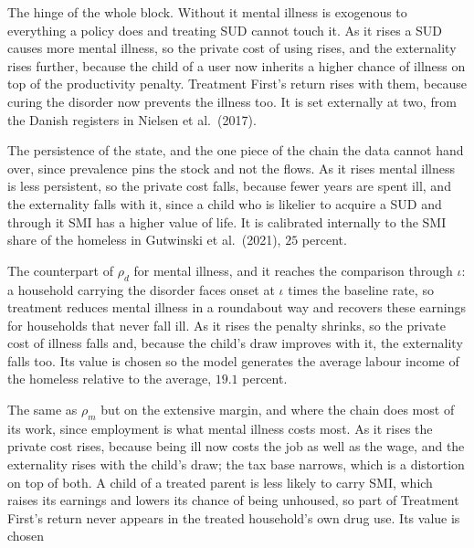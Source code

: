 \documentclass[10pt]{article}
\begin{document}
\begin{description}\setlength{\itemsep}{0.25em}\setlength{\parskip}{0em}
\item[$\iota$, the SUD multiplier on SMI onset.] The hinge of the whole block.
Without it mental illness is exogenous to everything a policy does and
treating SUD cannot touch it. As it rises a SUD causes more mental illness,
so the private cost of using rises, and the externality rises further, because the
child of a user now inherits a higher chance of illness on top of the productivity
penalty. Treatment First's return rises with them, because curing
the disorder now prevents the illness too. It is set externally at two, from the
Danish registers in Nielsen et al.\ (2017).
\item[$\lambda_m$, the annual chance of recovering from SMI.] The persistence of the state,
and the one piece of the chain the data cannot hand over, since prevalence pins the
stock and not the flows. As it rises mental illness is less persistent,
so the private cost falls, because fewer years are spent ill, and the externality
falls with it, since a child who is likelier to acquire a SUD and
through it SMI has a higher value of life. It is calibrated internally to the SMI
share of the homeless in Gutwinski et al.\ (2021), $25$ percent.
\item[$\rho_m$, earnings lost to SMI.] The counterpart of $\rho_d$ for mental
illness, and it reaches the comparison through $\iota$: a household carrying the
disorder faces onset at $\iota$ times the baseline rate, so treatment reduces mental
illness in a roundabout way and recovers these earnings for households that never
fall ill. As it rises the penalty shrinks, so the private cost of
illness falls and, because the child's draw improves with it, the externality falls
too. Its
value is chosen so the model generates the average labour income of the
homeless relative to the average, $19.1$ percent.
\item[$\kappa_{uem}$, the employment multiplier for SMI.] The same as
$\rho_m$ but on the extensive margin, and where the chain does most of its work, since employment is what mental
illness costs most. As it rises the private cost rises, because being
ill now costs the job as well as the wage, and the externality rises with the
child's draw; the tax base
narrows, which is a distortion on top of both. A child of a treated parent is less likely to carry SMI, which raises its
earnings and lowers its chance of being unhoused, so part of Treatment First's
return never appears in the treated household's own drug use. Its value is chosen

\end{description}
\end{document}
